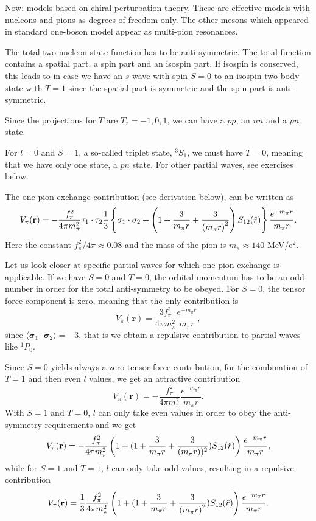 \documentclass[%
oneside,                 %
final,                   %
10pt]{article}
\begin{document}
\noindent
Now: models based on chiral perturbation theory. These are effective models with nucleons and pions as degrees of freedom only. The other mesons which appeared in standard one-boson model appear as multi-pion resonances. 

The total two-nucleon state function has to be anti-symmetric. The total function contains a spatial part, a spin part and an isospin part. If isospin is conserved, this leads to in case we have an $s$-wave with spin $S=0$ to an isospin 
two-body state with $T=1$ since the spatial part is symmetric and the spin part is anti-symmetric. 

Since the projections for $T$ are $T_z=-1,0,1$, we can have a $pp$, an $nn$ and a $pn$ state.

For $l=0$ and $S=1$, a so-called triplet state, $^3S_1$, we must have $T=0$, meaning that we have only one state, a $pn$ state. For other partial waves, see exercises below. 

The one-pion exchange contribution (see derivation below), can be written as 
\[
V_{\pi}(\mathbf{r})= -\frac{f_{\pi}^{2}}{4\pi m_{\pi}^{2}}\mathbf{ \tau}_1\cdot\mathbf{\tau}_2
\frac{1}{3}\left\{\mathbf{ \sigma}_1\cdot\mathbf{ \sigma}_2+\left( 1 + {3\over m_\pi r} + {3\over\left(m_\pi r\right)^2}\right) S_{12} (\hat r)\right\} \frac{e^{-m_\pi r}}{m_\pi r}.
\]
Here the constant $f_{\pi}^{2}/4\pi\approx 0.08$ and the mass of the pion is $m_\pi\approx 140$ MeV/$\mbox{c}^2$.  

Let us look closer at specific partial waves for which one-pion exchange is applicable. If we have $S=0$ and $T=0$, the 
orbital momentum has to be an odd number in order for the total anti-symmetry to be obeyed. For $S=0$, the tensor force component is zero, meaning that 
the only contribution is 
\[
V_{\pi}(\mathbf{r})=\frac{3f_{\pi}^{2}}{4\pi m_{\pi}^{2}}\frac{e^{-m_\pi r}}{m_\pi r},
\]
since $\langle\mathbf{ \sigma}_1\cdot\mathbf{ \sigma}_2\rangle=-3$, that is we obtain a repulsive contribution to partial waves like 
$^1P_0$.

Since $S=0$ yields always a zero tensor force contribution, for the combination of $T=1$ and then even $l$ values, we get an attractive contribution
\[
V_{\pi}(\mathbf{r})=-\frac{f_{\pi}^{2}}{4\pi m_{\pi}^{2}}\frac{e^{-m_\pi r}}{m_\pi r}.
\]
With $S=1$ and $T=0$, $l$ can only take even values in order to obey the anti-symmetry requirements and we get
\[
V_{\pi}(\mathbf{r})= -\frac{f_{\pi}^{2}}{4\pi m_{\pi}^{2}}
\left(1+( 1 + {3\over m_\pi r} + {3\over\left(m_\pi r\right))^2}) S_{12} (\hat r)\right) \frac{e^{-m_\pi r}}{m_\pi r},
\]
while for $S=1$ and $T=1$, $l$ can only take odd values, resulting in a repulsive contribution 
\[
V_{\pi}(\mathbf{r})= \frac{1}{3}\frac{f_{\pi}^{2}}{4\pi m_{\pi}^{2}}\left(1+( 1 + {3\over m_\pi r} + {3\over\left(m_\pi r\right)^2}) S_{12} (\hat r)\right) \frac{e^{-m_\pi r}}{m_\pi r}.
\]
\end{document}
